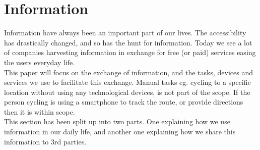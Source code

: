 \section{Information}
Information have always been an important part of our lives. The accessibility has drastically changed, and so has the hunt for information. Today we see a lot of companies harvesting information in exchange for free (or paid) services easing the users everyday life.\\

This paper will focus on the exchange of information, and the tasks, devices and services we use to facilitate this exchange. Manual tasks eg. cycling to a specific location without using any technological devices, is not part of the scope. If the person cycling is using a smartphone to track the route, or provide directions then it is within scope.\\

This section has been split up into two parts. One explaining how we use information in our daily life, and another one explaining how we share this information to 3rd parties.
